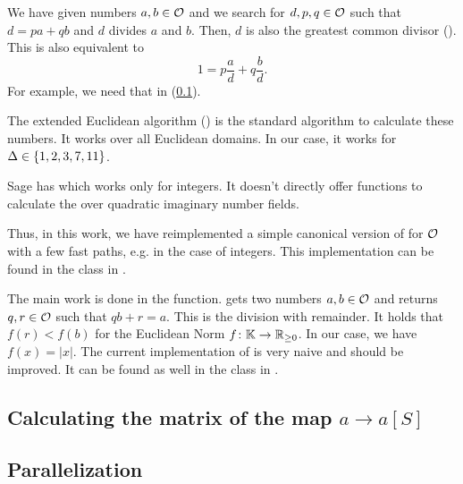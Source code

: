 We have given numbers $a,b \in \mathcal{O}$ and we search for $d,p,q \in \mathcal{O}$ such that $d = pa + qb$ and $d$ divides $a$ and $b$. Then, $d$ is also the greatest common divisor (). This is also equivalent to
\[ 1 = p \frac{a}{d} + q \frac{b}{d} . \]
%
For example, we need that in  (\cref{solveR}).

The extended Euclidean algorithm () is the standard algorithm to calculate these numbers. It works over all Euclidean domains. In our case, it works for $\Delta \in \Set{1, 2, 3, 7, 11}$.

Sage has  which works only for integers. It doesn't directly offer functions to calculate the  over quadratic imaginary number fields.

Thus, in this work, we have reimplemented a simple canonical version of  for $\mathcal{O}$ with a few fast paths, e.g. in the case of integers. This implementation can be found in the class  in .

The main work is done in the  function.  gets two numbers $a, b \in \mathcal{O}$ and returns $q, r \in \mathcal{O}$ such that $q b + r = a$. This is the division with remainder. It holds that $f(r) < f(b)$ for the Euclidean Norm $f \colon \mathbb{K} \rightarrow \mathbb{R}_{\ge 0}$. In our case, we have $f(x) = |x|$. The current implementation of  is very naive and should be improved. It can be found as well in the class  in .


\subsection{}
\label{solveR}
\label{impl:solveR}

\subsection{Calculating the matrix of the map $a \rightarrow a[S]$}
\label{impl:calcMatrix}

\subsection{Parallelization}
\label{impl:parallelization}
